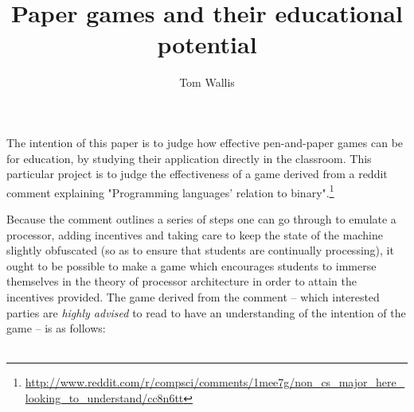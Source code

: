 \documentclass[a4paper]{article}
\title{Paper games and their educational potential}
\author{Tom Wallis}
\begin{document}
\maketitle

The intention of this paper is to judge how effective pen-and-paper games can be for education, by studying their application directly in the classroom. 
This particular project is to judge the effectiveness of a game derived from a reddit comment explaining "Programming languages' relation to binary".\footnote{\url{http://www.reddit.com/r/compsci/comments/1mee7g/non_cs_major_here_looking_to_understand/cc8n6tt}}

Because the comment outlines a series of steps one can go through to emulate a processor, adding incentives and taking care to keep the state of the machine slightly obfuscated (so as to ensure that students are continually processing), it ought to be possible to make a game which encourages students to immerse themselves in the theory of processor architecture in order to attain the incentives provided.
The game derived from the comment -- which interested parties are \emph{highly advised} to read to have an understanding of the intention of the game -- is as follows: \\
\\
\end{document}
